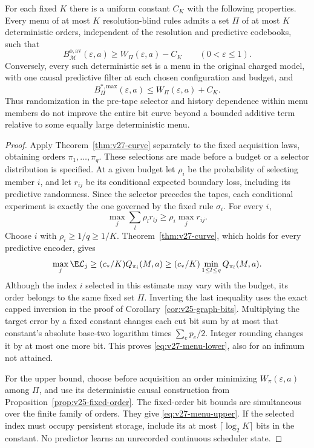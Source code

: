 \begin{theorem}
\label{thm:v27-menu}
For each fixed $K$ there is a uniform constant $C_K$ with the following properties. Every menu of at most $K$ resolution-blind rules admits a set $\Pi$ of at most $K$ deterministic orders, independent of the resolution and predictive codebooks, such that
\begin{equation}\label{eq:v27-menu-lower}
       B^{\mathrm{o,av}}_{\mathcal M}(\varepsilon,a)
                   \ge W_\Pi(\varepsilon,a)-C_K
                       \qquad(0<\varepsilon\le1).
\end{equation}
Conversely, every such deterministic set is a menu in the original charged model, with one causal predictive filter at each chosen configuration and budget, and
\begin{equation}\label{eq:v27-menu-upper}
       B^{*,\mathrm{max}}_\Pi(\varepsilon,a)
                   \le W_\Pi(\varepsilon,a)+C_K.
\end{equation}
Thus randomization in the pre-tape selector and history dependence within menu members do not improve the entire bit curve beyond a bounded additive term relative to some equally large deterministic menu.
\end{theorem}
\begin{proof}
Apply Theorem~\ref{thm:v27-curve} separately to the fixed acquisition laws, obtaining orders $\pi_1,\ldots,\pi_q$. These selections are made before a budget or a selector distribution is specified. At a given budget let $\rho_i$ be the probability of selecting member $i$, and let $r_{ij}$ be its conditional expected boundary loss, including its predictive randomness. Since the selector precedes the tapes, each conditional experiment is exactly the one governed by the fixed rule $\sigma_i$. For every $i$,
\[
       \max_j\sum_l\rho_l r_{lj}\ge\rho_i\max_jr_{ij}.
\]
Choose $i$ with $\rho_i\ge1/q\ge1/K$. Theorem~\ref{thm:v27-curve}, which holds for every predictive encoder, gives
\[
       \max_j\E\mathcal L_j
          \ge(c_*/K)Q_{\pi_i}(M,a)
          \ge(c_*/K)\min_{1\le l\le q}Q_{\pi_l}(M,a).
\]
Although the index $i$ selected in this estimate may vary with the budget, its order belongs to the same fixed set $\Pi$. Inverting the last inequality uses the exact capped inversion in the proof of Corollary~\ref{cor:v25-graph-bits}. Multiplying the target error by a fixed constant changes each cut bit sum by at most that constant's absolute base-two logarithm times $\sum_ep_e/2$. Integer rounding changes it by at most one more bit. This proves \eqref{eq:v27-menu-lower}, also for an infimum not attained.

For the upper bound, choose before acquisition an order minimizing $W_\pi(\varepsilon,a)$ among $\Pi$, and use its deterministic causal construction from Proposition~\ref{prop:v25-fixed-order}. The fixed-order bit bounds are simultaneous over the finite family of orders. They give \eqref{eq:v27-menu-upper}. If the selected index must occupy persistent storage, include its at most $\lceil\log_2K\rceil$ bits in the constant. No predictor learns an unrecorded continuous scheduler state.
\end{proof}

